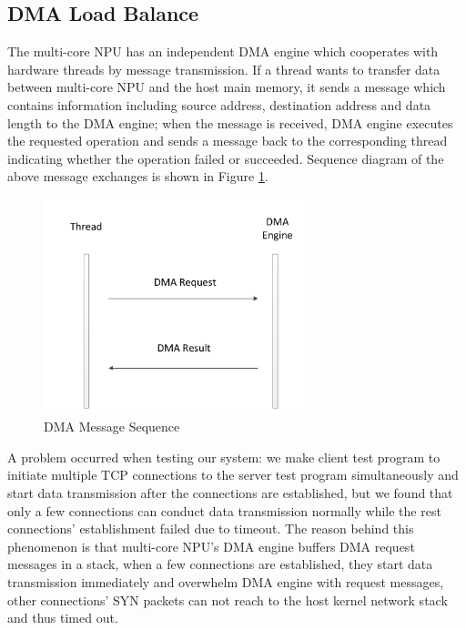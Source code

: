 \documentclass[conference]{IEEEtran}
\begin{document}
\subsection{DMA Load Balance}
The multi-core NPU has an independent DMA engine which cooperates with hardware threads by message transmission. If a thread wants to transfer data between multi-core NPU and the host main memory, it sends a message which contains information including source address, destination address and data length to the DMA engine; when the message is received, DMA engine executes the requested operation and sends a message back to the corresponding thread indicating whether the operation failed or succeeded. Sequence diagram of the above message exchanges is shown in Figure \ref{dma msg seq}.
\begin{figure}[!t]
\centering
\includegraphics[width=3.0in]{dma_msg_seq}
\caption{DMA Message Sequence}
\label{dma msg seq}
\end{figure}

A problem occurred when testing our system: we make client test program to initiate multiple TCP connections to the server test program simultaneously and start data transmission after the connections are established, but we found that only a few connections can conduct data transmission normally while the rest connections' establishment failed due to timeout. The reason behind this phenomenon is that multi-core NPU's DMA engine buffers DMA request messages in a stack, when a few connections are established, they start data transmission immediately and overwhelm DMA engine with request messages, other connections' SYN packets can not reach to the host kernel network stack and thus timed out.
\end{document}
